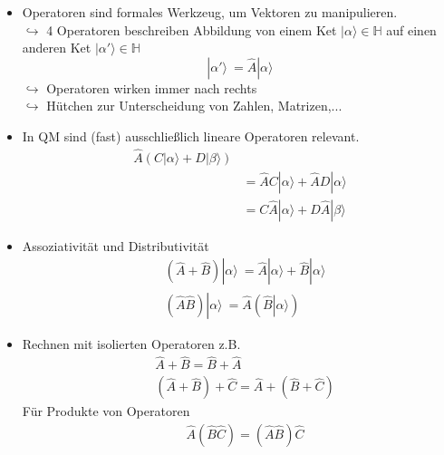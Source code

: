 \documentclass[10pt,article,colorback,accentcolor=tud9d]{scrartcl}
\begin{document}
\begin{itemize}
\item Operatoren sind formales Werkzeug, um Vektoren zu manipulieren. \\
$\hookrightarrow$ 4 Operatoren beschreiben Abbildung von einem Ket $\left|\right. 
\alpha \rangle  \in \mathbb{H}$ auf einen anderen Ket  $\left|\right. \alpha' \rangle  \in 
\mathbb{H}$
\begin{equation}
  \left|\right. \alpha' \rangle  \ = \hat{A} \left|\right. \alpha \rangle 
\end{equation}
$\hookrightarrow$ Operatoren wirken immer nach rechts\\
$\hookrightarrow$ Hütchen zur Unterscheidung von Zahlen, Matrizen,...
\item In QM sind (fast) ausschließlich lineare Operatoren relevant.
\begin{equation}
\begin{aligned}
  \hat{A} (C\left|\right. \alpha \rangle  + D\left|\right. \beta \rangle )&\\
  &= \hat{A} C\left|\right. \alpha \rangle  + \hat{A} D \left|\right. \alpha \rangle \\
  &= C \hat{A} \left|\right. \alpha \rangle  + D \hat{A} \left|\right. \beta \rangle 
\end{aligned}
\end{equation}
\item Assoziativität und Distributivität 
\begin{equation}
\begin{aligned}
&(\hat{A} + \hat{B}) \left|\right. \alpha \rangle  \ = \hat{A} \left|\right. \alpha \rangle 
 + \hat{B} \left|\right. \alpha \rangle \\
&(\hat{A} \hat{B})\left|\right. \alpha \rangle  \ = \hat{A} (\hat{B} \left|\right. 
\alpha \rangle )
\end{aligned}
\end{equation}
\item Rechnen mit isolierten Operatoren z.B.
\begin{equation}
\begin{aligned}
  &\hat{A} + \hat{B} = \hat{B} + \hat{A} \\
  &(\hat{A} + \hat{B}) + \hat{C}= \hat{A} +(\hat{B}+ \hat{C})
\end{aligned}
\end{equation}
Für Produkte von Operatoren
\begin{equation}
\begin{aligned}
  &\hat{A}(\hat{B} \hat{C}) = (\hat{A} \hat{B})\hat{C}

\end{aligned}
\end{equation}
\end{itemize}
\end{document}
